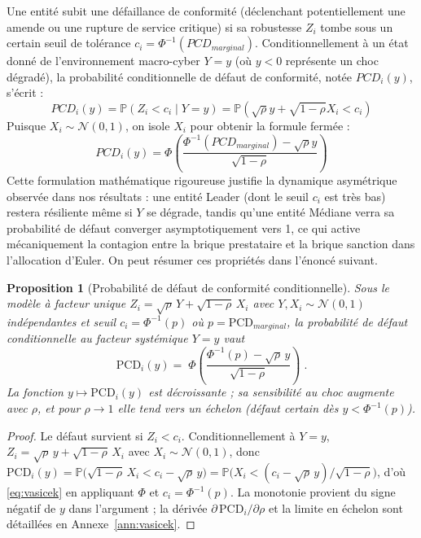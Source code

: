 \documentclass[11pt,a4paper]{article}
\theoremstyle{navystyle}
\newtheorem{proposition}[theorem]{Proposition}
\theoremstyle{navydef}
\newcommand{\Prob}{\mathbb{P}}
\begin{document}
Une entité subit une défaillance de conformité (déclenchant potentiellement une amende ou une rupture de service critique) si sa robustesse $Z_i$ tombe sous un certain seuil de tolérance $c_i = \Phi^{-1}(PCD_{marginal})$. Conditionnellement à un état donné de l'environnement macro-cyber $Y = y$ (où $y < 0$ représente un choc dégradé), la probabilité conditionnelle de défaut de conformité, notée $PCD_i(y)$, s'écrit :
\begin{equation}
PCD_i(y) = \mathbb{P}(Z_i < c_i \mid Y = y) = \mathbb{P}\left( \sqrt{\rho}y + \sqrt{1-\rho}X_i < c_i \right)
\end{equation}
Puisque $X_i \sim \mathcal{N}(0,1)$, on isole $X_i$ pour obtenir la formule fermée :
\begin{equation}
PCD_i(y) = \Phi \left( \frac{\Phi^{-1}(PCD_{marginal}) - \sqrt{\rho}y}{\sqrt{1-\rho}} \right)
\end{equation}
Cette formulation mathématique rigoureuse justifie la dynamique asymétrique observée dans nos résultats : une entité \og Leader\fg{} (dont le seuil $c_i$ est très bas) restera résiliente même si $Y$ se dégrade, tandis qu'une entité \og Médiane\fg{} verra sa probabilité de défaut converger asymptotiquement vers 1, ce qui active mécaniquement la contagion entre la brique prestataire et la brique sanction dans l'allocation d'Euler. On peut résumer ces propriétés dans l'énoncé suivant.

\begin{proposition}[Probabilité de défaut de conformité conditionnelle]\label{prop:vasicek}
Sous le modèle à facteur unique $Z_i=\sqrt{\rho}\,Y+\sqrt{1-\rho}\,X_i$ avec $Y,X_i\sim\mathcal{N}(0,1)$ indépendantes et seuil $c_i=\Phi^{-1}(p)$ où $p=\mathrm{PCD}_{marginal}$, la probabilité de défaut conditionnelle au facteur systémique $Y=y$ vaut
\begin{equation}
\mathrm{PCD}_i(y)=\boxed{\;\Phi\!\left(\frac{\Phi^{-1}(p)-\sqrt{\rho}\,y}{\sqrt{1-\rho}}\right)\;}.
\label{eq:vasicek}
\end{equation}
La fonction $y\mapsto\mathrm{PCD}_i(y)$ est décroissante ; sa sensibilité au choc augmente avec $\rho$, et pour $\rho\to1$ elle tend vers un échelon (défaut certain dès $y<\Phi^{-1}(p)$).
\end{proposition}

\begin{proof}
Le défaut survient si $Z_i<c_i$. Conditionnellement à $Y=y$, $Z_i=\sqrt\rho\,y+\sqrt{1-\rho}\,X_i$ avec $X_i\sim\mathcal N(0,1)$, donc
$\mathrm{PCD}_i(y)=\Prob\!\bigl(\sqrt{1-\rho}\,X_i<c_i-\sqrt\rho\,y\bigr)=\Prob\!\bigl(X_i<(c_i-\sqrt\rho\,y)/\sqrt{1-\rho}\bigr)$, d'où \eqref{eq:vasicek} en appliquant $\Phi$ et $c_i=\Phi^{-1}(p)$. La monotonie provient du signe négatif de $y$ dans l'argument ; la dérivée $\partial\,\mathrm{PCD}_i/\partial\rho$ et la limite en échelon sont détaillées en Annexe~\ref{ann:vasicek}.
\end{proof}
\end{document}
